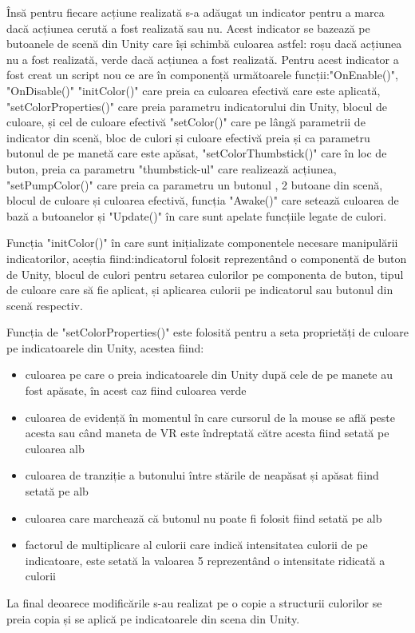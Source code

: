  
Însă pentru fiecare acțiune realizată s-a adăugat un indicator pentru a marca dacă acțiunea cerută a fost realizată sau nu. Acest indicator se bazează pe butoanele de scenă din Unity care își schimbă culoarea astfel: roșu dacă acțiunea nu a fost realizată, verde dacă acțiunea a fost realizată.  Pentru acest indicator a fost creat un script nou ce are în componență următoarele funcții:"OnEnable()", "OnDisable()" "initColor()" care preia ca  culoarea efectivă care este aplicată, "setColorProperties()" care preia parametru indicatorului din Unity, blocul de culoare, și cel de culoare efectivă "setColor()" care pe lângă parametrii de indicator din scenă, bloc de culori și culoare efectivă preia și ca parametru butonul de pe manetă care este apăsat,  "setColorThumbstick()" care în loc de buton, preia ca parametru "thumbstick-ul" care realizează acțiunea, "setPumpColor()" care preia ca parametru un butonul , 2 butoane din scenă, blocul de culoare și culoarea efectivă, funcția "Awake()" care setează culoarea de bază a butoanelor și "Update()" în care sunt apelate funcțiile legate de culori.

Funcția "initColor()" în care sunt inițializate componentele necesare manipulării indicatorilor, aceștia fiind:indicatorul folosit reprezentând o componentă de buton de Unity, blocul de culori pentru setarea culorilor pe componenta de buton, tipul de culoare care să fie aplicat, și aplicarea culorii pe indicatorul sau butonul din scenă respectiv.

Funcția de "setColorProperties()" este folosită pentru a seta proprietăți de culoare pe indicatoarele din Unity, acestea fiind:
\begin{itemize}
	\item culoarea pe care o preia indicatoarele  din Unity după cele de pe manete au fost apăsate, în acest caz fiind culoarea verde
	\item culoarea de evidență în momentul în care cursorul de la mouse se află peste acesta sau când maneta de VR este îndreptată către acesta fiind setată pe culoarea alb
	\item culoarea de tranziție a butonului între stările de neapăsat și apăsat fiind setată pe alb
	\item culoarea care marchează că butonul nu poate fi folosit fiind setată pe alb
	\item factorul de multiplicare al culorii care indică intensitatea culorii de pe indicatoare, este setată la valoarea 5 reprezentând o intensitate ridicată a culorii
	
\end{itemize}
La final deoarece modificările s-au realizat pe o copie a structurii culorilor se preia copia și se aplică pe indicatoarele din scena din Unity.

